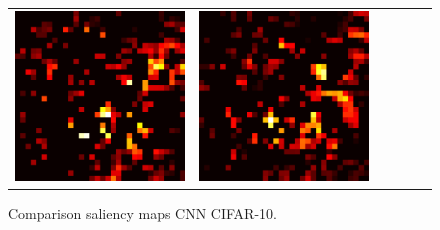 \documentclass[preprint,12pt]{elsarticle}
\begin{document}
\begin{figure}[p]
\begin{tabular}{cccccc}
  \includegraphics[scale=\scale]{../visualizations/examples/cifar10/cnn/active_saliency_map/9.png} & 
  \includegraphics[scale=\scale]{../visualizations/examples/cifar10/cnn/inactive_saliency_map/9.png} \\
  \end{tabular}
  \caption{Comparison saliency maps CNN CIFAR-10.}
\end{figure}
\end{document}
